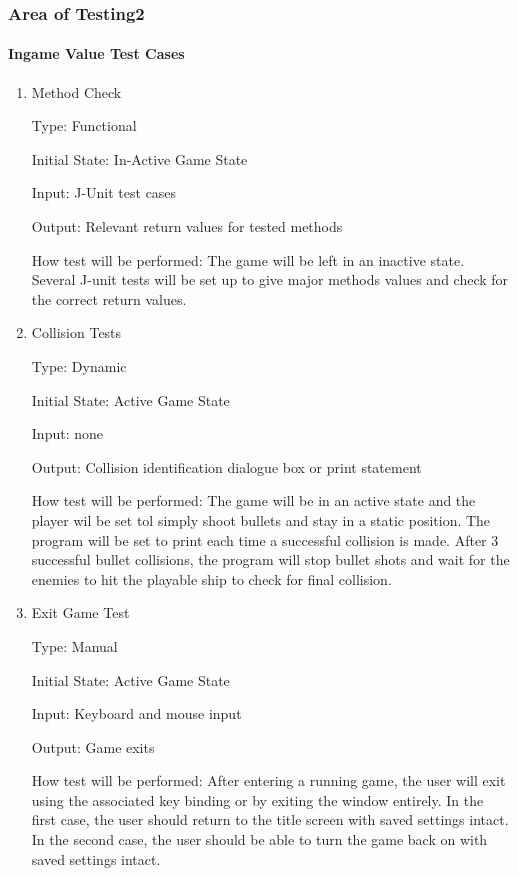 \documentclass[12pt, titlepage]{article}
\begin{document}
\subsubsection{Area of Testing2}

\paragraph{Ingame Value Test Cases}

\begin{enumerate}

\item{Method Check\\}

Type: Functional

Initial State: In-Active Game State 

Input: J-Unit test cases  %

Output: Relevant return values for tested methods 

How test will be performed: The game will be left in an inactive state. Several J-unit tests will be set up to give major methods values and check for the correct return values.

\item{Collision Tests\\}

Type: Dynamic

Initial State: Active Game State 

Input: none

Output: Collision identification dialogue box or print statement 

How test will be performed: The game will be in an active state and the player wil be set tol %
simply shoot bullets and stay in a static position. The program will be set to print each time a successful collision is made. After 3 successful bullet collisions, the program will stop bullet shots and wait for the enemies to hit the playable ship to check for final collision. 

\item{Exit Game Test\\}

Type: Manual

Initial State: Active Game State 

Input: Keyboard and mouse input

Output: Game exits 

How test will be performed: After entering a running game, the user will exit using the associated key binding or by exiting the window entirely. In the first case, the user should return to the title screen with saved settings intact. In the second case, the user should be able to turn the game back on with saved settings intact. 


\end{enumerate}
\end{document}
